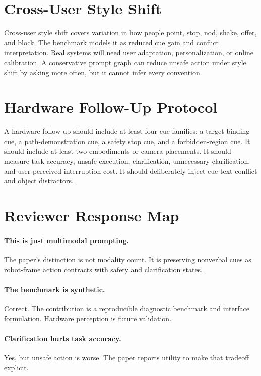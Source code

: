 \documentclass{article}
\begin{document}
\section{Cross-User Style Shift}

Cross-user style shift covers variation in how people point, stop, nod, shake, offer, and block. The benchmark models it as reduced cue gain and conflict interpretation. Real systems will need user adaptation, personalization, or online calibration. A conservative prompt graph can reduce unsafe action under style shift by asking more often, but it cannot infer every convention.

\section{Hardware Follow-Up Protocol}

A hardware follow-up should include at least four cue families: a target-binding cue, a path-demonstration cue, a safety stop cue, and a forbidden-region cue. It should include at least two embodiments or camera placements. It should measure task accuracy, unsafe execution, clarification, unnecessary clarification, and user-perceived interruption cost. It should deliberately inject cue-text conflict and object distractors.

\section{Reviewer Response Map}

\paragraph{This is just multimodal prompting.}
The paper's distinction is not modality count. It is preserving nonverbal cues as robot-frame action contracts with safety and clarification states.

\paragraph{The benchmark is synthetic.}
Correct. The contribution is a reproducible diagnostic benchmark and interface formulation. Hardware perception is future validation.

\paragraph{Clarification hurts task accuracy.}
Yes, but unsafe action is worse. The paper reports utility to make that tradeoff explicit.
\end{document}
